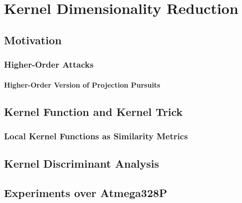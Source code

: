 
\chapter{Kernel Dimensionality Reduction} %

\label{ChapterKernel}


\section{Motivation}
\subsection{Higher-Order Attacks}
\subsubsection{Higher-Order Version of Projection Pursuits}


\section{Kernel Function and Kernel Trick}
\subsection{Local Kernel Functions as Similarity Metrics}
\section{Kernel Discriminant Analysis}

\section{Experiments over Atmega328P}
